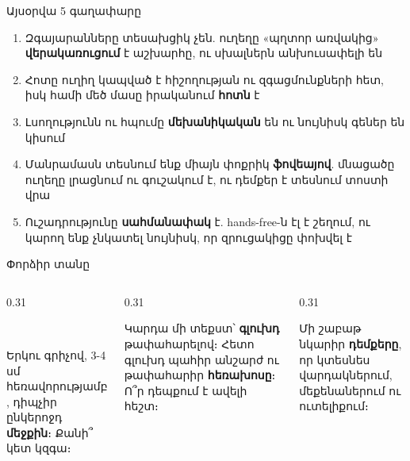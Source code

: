 \notopic

\begin{frame}{Այսօրվա 5 գաղափարը}
  \begin{enumerate}
    \item<1-> Զգայարանները տեսախցիկ չեն. ուղեղը «պղտոր առվակից» \textbf{վերակառուցում} է աշխարհը, ու սխալներն անխուսափելի են
    \item<2-> Հոտը ուղիղ կապված է հիշողության ու զգացմունքների հետ, իսկ համի մեծ մասը իրականում \textbf{հոտն} է
    \item<3-> Լսողությունն ու հպումը \textbf{մեխանիկական} են ու նույնիսկ գեներ են կիսում
    \item<4-> Մանրամասն տեսնում ենք միայն փոքրիկ \textbf{ֆովեայով}. մնացածը ուղեղը լրացնում ու գուշակում է, ու դեմքեր է տեսնում տոստի վրա
    \item<5-> Ուշադրությունը \textbf{սահմանափակ} է. hands-free-ն էլ է շեղում, ու կարող ենք չնկատել նույնիսկ, որ զրուցակիցը փոխվել է
  \end{enumerate}
\end{frame}

\begin{frame}{Փորձիր տանը}
  \begin{columns}[T]
    \begin{column}{0.31\textwidth}
      \begin{card}[colback=mint!30!cardwhite]
        \centering{}\ \par\smallskip
        \raggedright Երկու գրիչով, 3-4 սմ հեռավորությամբ, դիպչիր ընկերոջդ \textbf{մեջքին}։ Քանի՞ կետ կզգա։
      \end{card}
    \end{column}
    \begin{column}{0.31\textwidth}
      \begin{card}[colback=lavender!35!cardwhite]
        \centering{}\par\smallskip
        \raggedright Կարդա մի տեքստ՝ \textbf{գլուխդ} թափահարելով։ Հետո գլուխդ պահիր անշարժ ու թափահարիր \textbf{հեռախոսը}։ Ո՞ր դեպքում է ավելի հեշտ։
      \end{card}
    \end{column}
    \begin{column}{0.31\textwidth}
      \begin{card}[colback=peach!35!cardwhite]
        \centering{}\par\smallskip
        \raggedright Մի շաբաթ նկարիր \textbf{դեմքերը}, որ կտեսնես վարդակներում, մեքենաներում ու ուտելիքում։
      \end{card}
    \end{column}
  \end{columns}
\end{frame}

